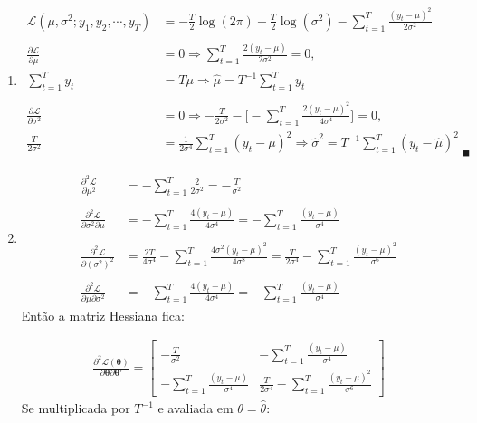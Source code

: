 \begin{enumerate}
	
	\begin{enumerate}
		\item %
		
		\begin{align*}
			\mathscr{L}(\mu, \sigma^2;y_1,y_2,\cdots,y_T)&=-\frac{T}{2}\log(2\pi)-\frac{T}{2}\log(\sigma^2)-\sum\limits_{t=1}^{T}\frac{(y_t-\mu)^2}{2\sigma^2}\\
			\\
			\frac{\partial \mathscr{L}}{\partial\mu}&=0\Rightarrow \sum\limits_{t=1}^{T}\frac{2(y_t-\mu)}{2\sigma^2}=0,\\
			\sum\limits_{t=1}^{T}y_t&=T\mu\Rightarrow\hat{\mu}=T^{-1}\sum\limits_{t=1}^{T}y_t\\
			\\
			\frac{\partial \mathscr{L}}{\partial\sigma^2}&=0\Rightarrow-\frac{T}{2\sigma^2}-\bigg[-\sum\limits_{t=1}^{T}\frac{2(y_t-\mu)^2}{4\sigma^4}\bigg]=0,\\
			\frac{T}{2\sigma^2}&=\frac{1}{2\sigma^4}\sum\limits_{t=1}^{T}(y_t-\mu)^2\Rightarrow\hat{\sigma}^2=T^{-1}\sum\limits_{t=1}^{T}(y_t-\hat{\mu})^2_{\quad\blacksquare}
		\end{align*}
	
		\item %
		
		\begin{align*}
			\frac{\partial^2\mathscr{L}}{\partial\mu^2}&=-\sum\limits_{t=1}^T\frac{2}{2\sigma^2}=-\frac{T}{\sigma^2}\\
			\\
			\frac{\partial^2\mathscr{L}}{\partial\sigma^2\partial\mu}&=-\sum\limits_{t=1}^T\frac{4(y_t-\mu)}{4\sigma^4}=-\sum\limits_{t=1}^T\frac{(y_t-\mu)}{\sigma^4}\\
			\\
			\frac{\partial^2\mathscr{L}}{\partial(\sigma^2)^2}&=\frac{2T}{4\sigma^4}-\sum\limits_{t=1}^T\frac{4\sigma^2(y_t-\mu)^2}{4\sigma^8}=\frac{T}{2\sigma^4}-\sum\limits_{t=1}^T\frac{(y_t-\mu)^2}{\sigma^6}\\
			\\
			\frac{\partial^2\mathscr{L}}{\partial\mu\partial\sigma^2}&=-\sum\limits_{t=1}^{T}\frac{4(y_t-\mu)}{4\sigma^4}=-\sum\limits_{t=1}^{T}\frac{(y_t-\mu)}{\sigma^4}
		\end{align*}
		Então a matriz Hessiana fica:
		
		\begin{align*}
			\frac{\partial^2 \mathscr{L}(\boldsymbol{\theta})}{\partial\boldsymbol{\theta}\partial\boldsymbol{\theta}'}=\begin{bmatrix}
				-\frac{T}{\sigma^2}&-\sum\limits_{t=1}^T\frac{(y_t-\mu)}{\sigma^4}\\
				-\sum\limits_{t=1}^T\frac{(y_t-\mu)}{\sigma^4}&\frac{T}{2\sigma^4}-\sum\limits_{t=1}^T\frac{(y_t-\mu)^2}{\sigma^6}
			\end{bmatrix}
		\end{align*}
		Se multiplicada por $T^{-1}$ e avaliada em $\theta=\hat{\theta}$:
		

\end{enumerate}
\end{enumerate}
